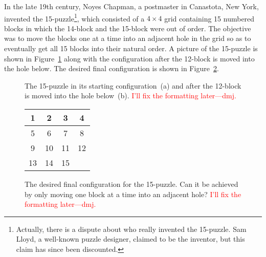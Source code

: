 In the late 19th century, Noyes Chapman, a postmaster in Canastota,
New York, invented the 15-puzzle\footnote{Actually, there is a dispute
about who really invented the 15-puzzle.  Sam Lloyd, a well-known
puzzle designer, claimed to be the inventor, but this claim has since
been discounted.}, which consisted of a $4\times 4$ grid containing 15
numbered blocks in which the 14-block and the 15-block were out of
order.  The objective was to move the blocks one at a time into an
adjacent hole in the grid so as to eventually get all 15 blocks into
their natural order.  A picture of the 15-puzzle is shown in
Figure~\ref{fig:15puzzle} along with the configuration after the
12-block is moved into the hole below.  The desired final
configuration is shown in Figure~\ref{fig:15puzzlesolved}.

\begin{figure}
\centering



\caption{The 15-puzzle in its starting configuration~(a) and after the
12-block is moved into the hole below~(b). \textcolor{red}{I'll fix
  the formatting later---dmj.}}
\label{fig:15puzzle}
\end{figure}

\begin{figure}

\begin{center}
\begin{tabular}{|c|c|c|c|}
\hline
1 & 2 & 3 & 4 \\\hline
5 & 6 & 7 & 8 \\\hline
9 & 10 & 11 & 12 \\\hline
13 & 14 & 15 &  \\\hline
\end{tabular}
\end{center}

\caption{The desired final configuration for the 15-puzzle.  Can it be
  achieved by only moving one block at a time into an adjacent hole?
  \textcolor{red}{I'll fix the formatting later---dmj.}}
\label{fig:15puzzlesolved}
\end{figure}

